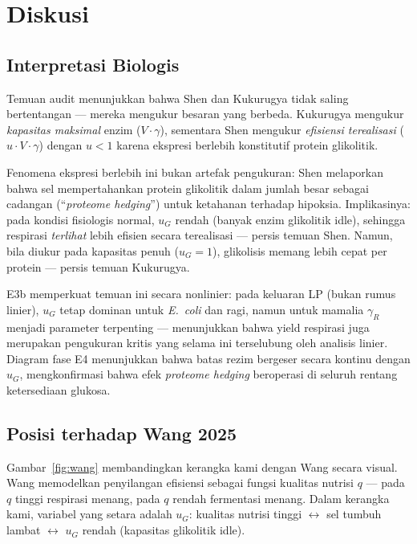 \section{Diskusi}

\subsection{Interpretasi Biologis}

Temuan audit menunjukkan bahwa Shen dan Kukurugya tidak saling
bertentangan --- mereka mengukur besaran yang berbeda. Kukurugya mengukur
\textit{kapasitas maksimal} enzim ($V \cdot \gamma$), sementara Shen
mengukur \textit{efisiensi terealisasi} ($u \cdot V \cdot \gamma$) dengan
$u < 1$ karena ekspresi berlebih konstitutif protein glikolitik.

Fenomena ekspresi berlebih ini bukan artefak pengukuran: Shen melaporkan
bahwa sel mempertahankan protein glikolitik dalam jumlah besar sebagai
cadangan (``\textit{proteome hedging}'') untuk ketahanan terhadap hipoksia.
Implikasinya: pada kondisi fisiologis normal, $u_G$ rendah (banyak enzim
glikolitik idle), sehingga respirasi \textit{terlihat} lebih efisien secara
terealisasi --- persis temuan Shen. Namun, bila diukur pada kapasitas penuh
($u_G = 1$), glikolisis memang lebih cepat per protein --- persis temuan
Kukurugya.

E3b memperkuat temuan ini secara nonlinier: pada keluaran LP (bukan
rumus linier), $u_G$ tetap dominan untuk \textit{E.\ coli} dan ragi,
namun untuk mamalia $\gamma_R$ menjadi parameter terpenting --- menunjukkan
bahwa yield respirasi juga merupakan pengukuran kritis yang selama ini
terselubung oleh analisis linier. Diagram fase E4 menunjukkan bahwa
batas rezim bergeser secara kontinu dengan $u_G$, mengkonfirmasi
bahwa efek \textit{proteome hedging} beroperasi di seluruh rentang
ketersediaan glukosa.

\subsection{Posisi terhadap Wang 2025}

Gambar~\ref{fig:wang} membandingkan kerangka kami dengan Wang secara visual.
Wang memodelkan penyilangan efisiensi sebagai fungsi kualitas nutrisi $q$
--- pada $q$ tinggi respirasi menang, pada $q$ rendah fermentasi menang.
Dalam kerangka kami, variabel yang setara adalah $u_G$: kualitas nutrisi
tinggi $\leftrightarrow$ sel tumbuh lambat $\leftrightarrow$ $u_G$ rendah
(kapasitas glikolitik idle).

